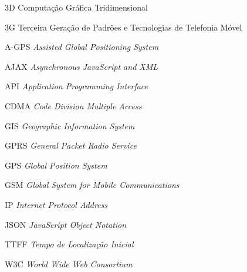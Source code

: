 
\begin{siglas}
    \item[3D] Computação Gráfica Tridimensional
    \item[3G] Terceira Geração de Padrões e Tecnologias de Telefonia Móvel
    \item[A-GPS] \textit{Assisted Global Positioning System}
    \item[AJAX] \textit{Asynchronous JavaScript and XML}
    \item[API] \textit{Application Programming Interface}
    \item[CDMA] \textit{Code Division Multiple Access}
    \item[GIS] \textit{Geographic Information System}
    \item[GPRS] \textit{General Packet Radio Service}
    \item[GPS] \textit{Global Position System}
    \item[GSM] \textit{Global System for Mobile Communications}
    \item[IP] \textit{Internet Protocol Address}
    \item[JSON] \textit{JavaScript Object Notation}
    \item[TTFF] \textit{Tempo de Localização Inicial}
    \item[W3C] \textit{World Wide Web Consortium}
    
\end{siglas}

